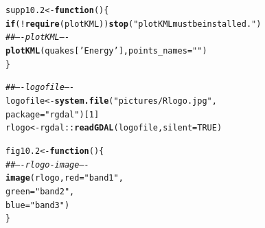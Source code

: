 \documentclass[12pt, a4paper,  BCOR=8.25mm, DIV=15]{scrartcl}\usepackage[]{graphicx}\usepackage[]{color}
\makeatletter
\newcommand{\hlnum}[1]{\textcolor[rgb]{0.686,0.059,0.569}{#1}}%
\newcommand{\hlstr}[1]{\textcolor[rgb]{0.192,0.494,0.8}{#1}}%
\newcommand{\hlcom}[1]{\textcolor[rgb]{0.678,0.584,0.686}{\textit{#1}}}%
\newcommand{\hlopt}[1]{\textcolor[rgb]{0,0,0}{#1}}%
\newcommand{\hlstd}[1]{\textcolor[rgb]{0.345,0.345,0.345}{#1}}%
\newcommand{\hlkwa}[1]{\textcolor[rgb]{0.161,0.373,0.58}{\textbf{#1}}}%
\newcommand{\hlkwb}[1]{\textcolor[rgb]{0.69,0.353,0.396}{#1}}%
\newcommand{\hlkwc}[1]{\textcolor[rgb]{0.333,0.667,0.333}{#1}}%
\newcommand{\hlkwd}[1]{\textcolor[rgb]{0.737,0.353,0.396}{\textbf{#1}}}%
\newenvironment{kframe}{%
 \def\at@end@of@kframe{}%
 \ifinner\ifhmode%
  \def\at@end@of@kframe{\end{minipage}}%
  \begin{minipage}{\columnwidth}%
 \fi\fi%
 \def\FrameCommand##1{\hskip\@totalleftmargin \hskip-\fboxsep
 \colorbox{shadecolor}{##1}\hskip-\fboxsep
     \hskip-\linewidth \hskip-\@totalleftmargin \hskip\columnwidth}%
 \MakeFramed {\advance\hsize-\width
   \@totalleftmargin\z@ \linewidth\hsize
   \@setminipage}}%
 {\par\unskip\endMakeFramed%
 \at@end@of@kframe}
\newenvironment{knitrout}{}{} %
\makeatother
\begin{document}
\begin{knitrout}
\color{fgcolor}\begin{kframe}
\begin{alltt}
\hlstd{supp10.2} \hlkwb{<-} \hlkwa{function}\hlstd{()\{}
    \hlkwa{if}\hlstd{(}\hlopt{!}\hlkwd{require}\hlstd{(plotKML))}\hlkwd{stop}\hlstd{(}\hlstr{"plotKML must be installed."}\hlstd{)}
\hlcom{## ---- plotKML ----}
\hlkwd{plotKML}\hlstd{(quakes[}\hlstr{'Energy'}\hlstd{],} \hlkwc{points_names}\hlstd{=}\hlstr{""}\hlstd{)}
\hlstd{\}}
\end{alltt}
\end{kframe}
\end{knitrout}

\begin{knitrout}
\color{fgcolor}\begin{kframe}
\begin{alltt}
\hlcom{## ---- logofile ----}
\hlstd{logofile} \hlkwb{<-} \hlkwd{system.file}\hlstd{(}\hlstr{"pictures/Rlogo.jpg"}\hlstd{,}
                        \hlkwc{package} \hlstd{=} \hlstr{"rgdal"}\hlstd{)[}\hlnum{1}\hlstd{]}
\hlstd{rlogo} \hlkwb{<-} \hlstd{rgdal}\hlopt{::}\hlkwd{readGDAL}\hlstd{(logofile,} \hlkwc{silent}\hlstd{=}\hlnum{TRUE}\hlstd{)}
\end{alltt}


{\ttfamily\noindent\color{warningcolor}{Warning in rgdal::readGDAL(logofile, silent = TRUE): GeoTransform values not available}}\begin{alltt}
\hlstd{fig10.2} \hlkwb{<-} \hlkwa{function}\hlstd{()\{}
\hlcom{## ---- rlogo-image ----}
\hlkwd{image}\hlstd{(rlogo,} \hlkwc{red}\hlstd{=}\hlstr{"band1"}\hlstd{,}
      \hlkwc{green}\hlstd{=}\hlstr{"band2"}\hlstd{,}
      \hlkwc{blue}\hlstd{=}\hlstr{"band3"}\hlstd{)}
\hlstd{\}}
\end{alltt}
\end{kframe}
\end{knitrout}
\end{document}
